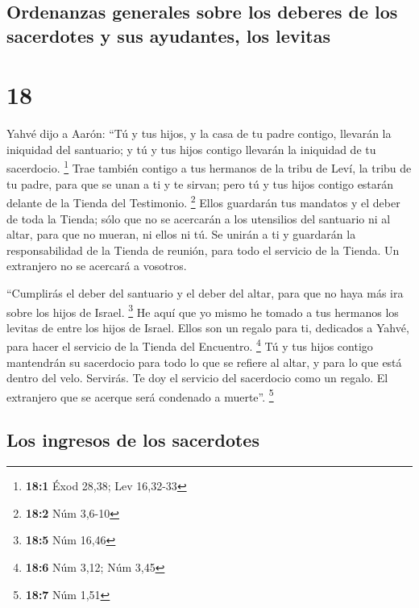 \hypertarget{ordenanzas-generales-sobre-los-deberes-de-los-sacerdotes-y-sus-ayudantes-los-levitas}{%
\subsection{Ordenanzas generales sobre los deberes de los sacerdotes y
sus ayudantes, los
levitas}\label{ordenanzas-generales-sobre-los-deberes-de-los-sacerdotes-y-sus-ayudantes-los-levitas}}

\hypertarget{section-17}{%
\section{18}\label{section-17}}

 Yahvé dijo a Aarón: ``Tú y tus hijos, y la casa de tu
padre contigo, llevarán la iniquidad del santuario; y tú y tus hijos
contigo llevarán la iniquidad de tu sacerdocio. \footnote{\textbf{18:1}
  Éxod 28,38; Lev 16,32-33}  Trae también contigo a tus
hermanos de la tribu de Leví, la tribu de tu padre, para que se unan a
ti y te sirvan; pero tú y tus hijos contigo estarán delante de la Tienda
del Testimonio. \footnote{\textbf{18:2} Núm 3,6-10}  Ellos
guardarán tus mandatos y el deber de toda la Tienda; sólo que no se
acercarán a los utensilios del santuario ni al altar, para que no
mueran, ni ellos ni tú.  Se unirán a ti y guardarán la
responsabilidad de la Tienda de reunión, para todo el servicio de la
Tienda. Un extranjero no se acercará a vosotros.

 ``Cumplirás el deber del santuario y el deber del altar,
para que no haya más ira sobre los hijos de Israel. \footnote{\textbf{18:5}
  Núm 16,46}  He aquí que yo mismo he tomado a tus
hermanos los levitas de entre los hijos de Israel. Ellos son un regalo
para ti, dedicados a Yahvé, para hacer el servicio de la Tienda del
Encuentro. \footnote{\textbf{18:6} Núm 3,12; Núm 3,45}  Tú
y tus hijos contigo mantendrán su sacerdocio para todo lo que se refiere
al altar, y para lo que está dentro del velo. Servirás. Te doy el
servicio del sacerdocio como un regalo. El extranjero que se acerque
será condenado a muerte''. \footnote{\textbf{18:7} Núm 1,51}

\hypertarget{los-ingresos-de-los-sacerdotes}{%
\subsection{Los ingresos de los
sacerdotes}\label{los-ingresos-de-los-sacerdotes}}

